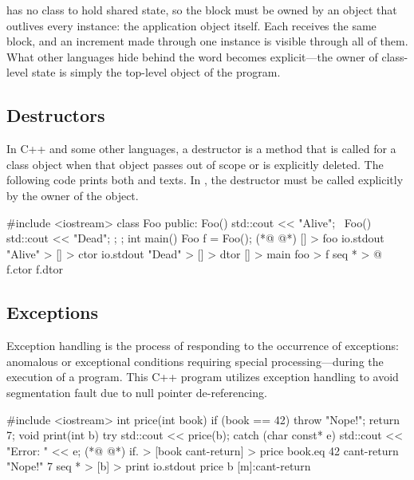 \eolang{} has no class to hold shared state, so the  block must be
  owned by an object that outlives every instance: the application object
   itself.
Each  receives the same block, and an increment made through one
  instance is visible through all of them.
What other languages hide behind the word  becomes explicit---the
  owner of class-level state is simply the top-level object of the program.

\subsection{Destructors}
\label{sec:destructors}

In C++ and some other languages, a destructor is a method
  that is called for a class object when that object passes
  out of scope or is explicitly deleted.
The following code prints both  and  texts.
In \eolang{}, the destructor must be called explicitly
  by the owner of the object.

\begin{ffcode}
#include <iostream>
class Foo {
public:
  Foo() { std::cout << "Alive"; }
  ~Foo() { std::cout << "Dead"; };
};
int main() {
  Foo f = Foo();
}
(*@ \ffcolumnbreak @*)
[] > foo
  io.stdout "Alive" > [] > ctor
  io.stdout "Dead" > [] > dtor
[] > main
  foo > f
  seq * > @
    f.ctor
    f.dtor
\end{ffcode}

\subsection{Exceptions}
\label{sec:exceptions}

\broken

Exception handling is the process of responding to the occurrence
  of exceptions: anomalous or exceptional conditions requiring special
  processing---during the execution of a program.
This C++ program utilizes exception handling
  to avoid segmentation fault due to null pointer de-referencing.

\begin{ffcode}
#include <iostream>
int price(int book) {
  if (book == 42) throw "Nope!";
  return 7;
}
void print(int b) {
  try {
    std::cout << price(b);
  } catch (char const* e) {
    std::cout << "Error: " << e;
  }
}
(*@ \ffcolumnbreak @*)
if. > [book cant-return] > price
  book.eq 42
  cant-return "Nope!"
  7
seq * > [b] > print
  io.stdout
    price
      b
      [m]:cant-return
\end{ffcode}
\begin{ffcode}
\end{ffcode}

